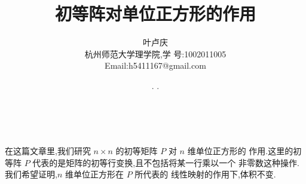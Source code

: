\documentclass[a4paper, 12pt]{article} %
\makeatletter
\renewcommand{\maketitle}{ %
  \renewcommand\refname{参考文献}
  \newcommand{\D}{\displaystyle}\newcommand{\ri}{\Rightarrow}
  \newcommand{\ds}{\displaystyle} \renewcommand{\ni}{\noindent}
  \newcommand{\pa}{\partial} \newcommand{\Om}{\Omega}
  \newcommand{\om}{\omega} \newcommand{\sik}{\sum_{i=1}^k}
  \newcommand{\vov}{\Vert\omega\Vert} \newcommand{\Umy}{U_{\mu_i,y^i}}
  \newcommand{\lamns}{\lambda_n^{^{\scriptstyle\sigma}}}
  \newcommand{\chiomn}{\chi_{_{\Omega_n}}}
  \newcommand{\ullim}{\underline{\lim}} \newcommand{\bsy}{\boldsymbol}
  \newcommand{\mvb}{\mathversion{bold}} \newcommand{\la}{\lambda}
  \newcommand{\La}{\Lambda} \newcommand{\va}{\varepsilon}
  \newcommand{\be}{\beta} \newcommand{\al}{\alpha}
  \newcommand{\dis}{\displaystyle} \newcommand{\R}{{\mathbb R}}
  \newcommand{\N}{{\mathbb N}} \newcommand{\cF}{{\mathcal F}}
  \newcommand{\gB}{{\mathfrak B}} \newcommand{\eps}{\epsilon}
  \begin{flushright} %
    {\LARGE\@title} %
    
    \vspace{50pt} %
    
    {\large\@author} %
    \\\@date %
    
    \vspace{40pt} %
  \end{flushright}
}
\makeatother
\begin{document}
\title{\textbf{初等阵对单位正方形的作用}}
\author{\small{叶卢庆}\\{\small{杭州师范大学理学院,学
      号:1002011005}}\\{\small{Email:h5411167@gmail.com}}} %
\renewcommand{\today}{\number\year. \number\month. \number\day}
\date{\today} %
  
  
  
\maketitle %
  
  
  
  
  
  
  
在这篇文章里,我们研究 $n\times n$ 的初等矩阵 $P$ 对 $n$ 维单位正方形的
作用.这里的初等阵 $P$ 代表的是矩阵的初等行变换,且不包括将某一行乘以一个
非零数这种操作.我们希望证明,$n$ 维单位正方形在 $P$ 所代表的
线性映射的作用下,体积不变.\\
\end{document}
